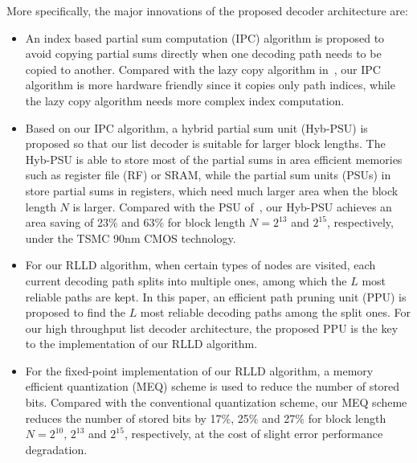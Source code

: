 \documentclass[journal]{IEEEtran}
\begin{document}
More specifically, the major innovations of the proposed decoder architecture are:
\begin{itemize}
\item An index based partial sum computation (IPC) algorithm is proposed to avoid copying partial sums directly when one decoding path needs to be copied to another. Compared with the lazy copy algorithm in~\cite{ido_it}, our IPC algorithm is more hardware friendly since it copies only path indices, while the lazy copy algorithm needs more complex index computation.
\item Based on our IPC algorithm, a hybrid partial sum unit (Hyb-PSU) is proposed so that our list decoder is suitable for larger block lengths. The Hyb-PSU is able to store most of the partial sums in area efficient memories such as register file (RF) or SRAM, while the partial sum units (PSUs) in~\cite{llr_list_tsp, jun_low_mem_list,tree_list_dec} store partial sums in registers, which need much larger area when the block length $N$ is larger. Compared with the PSU of~\cite{jun_low_mem_list}, our Hyb-PSU achieves an area saving of 23\% and 63\% for block length $N=2^{13}$ and $2^{15}$, respectively, under the TSMC 90nm CMOS technology.
\item For our RLLD algorithm, when certain types of nodes are visited, each current decoding path splits into multiple ones, among which the $L$ most reliable paths are kept. In this paper, an efficient path pruning unit (PPU) is proposed to find the $L$ most reliable decoding paths among the split ones. For our high throughput list decoder architecture, the proposed PPU is the key to the implementation of our RLLD algorithm.
\item For the fixed-point implementation of our RLLD algorithm, a memory efficient quantization (MEQ) scheme is used to reduce the number of stored bits. Compared with the conventional quantization scheme, our MEQ scheme reduces the number of stored bits by 17\%, 25\% and 27\% for block length $N=2^{10}$, $2^{13}$ and $2^{15}$, respectively, at the cost of slight error performance degradation.
\end{itemize}
\end{document}
